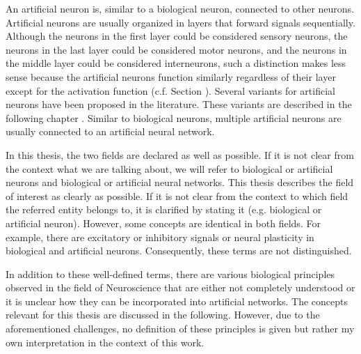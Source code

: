 An artificial neuron is, similar to a biological neuron, connected to other neurons.
Artificial neurons are usually organized in layers that forward signals sequentially.
Although the neurons in the first layer could be considered sensory neurons, the neurons in the last layer could be considered motor neurons, and the neurons in the middle layer could be considered interneurons, such a distinction makes less sense because the artificial neurons function similarly regardless of their layer except for the activation function (c.f. Section ).
Several variants for artificial neurons have been proposed in the literature. These variants are described in the following chapter .
Similar to biological neurons, multiple artificial neurons are usually connected to an artificial neural network.

In this thesis, the two fields are declared as well as possible.
If it is not clear from the context what we are talking about, we will refer to biological or artificial neurons and biological or artificial neural networks.
This thesis describes the field of interest as clearly as possible.
If it is not clear from the context to which field the referred entity belongs to, it is clarified by stating it (e.g. biological or artificial neuron).
However, some concepts are identical in both fields.
For example, there are excitatory or inhibitory signals or neural plasticity in biological and artificial neurons.
Consequently, these terms are not distinguished.

In addition to these well-defined terms, there are various biological principles observed in the field of Neuroscience that are either not completely understood or it is unclear how they can be incorporated into artificial networks.
The concepts relevant for this thesis are discussed in the following.
However, due to the aforementioned challenges, no definition of these principles is given but rather my own interpretation in the context of this work.


